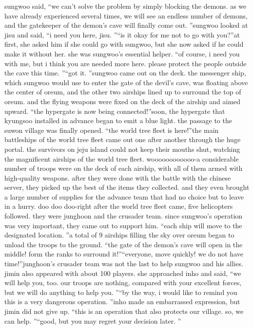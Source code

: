 sungwoo said, “we can’t solve the problem by simply blocking the demons.
 as we have already experienced several times, we will see an endless number of demons, and the gatekeeper of the demon’s cave will finally come out.
”sungwoo looked at jisu and said, “i need you here, jisu.
”“is it okay for me not to go with you?”at first, she asked him if she could go with sungwoo, but she now asked if he could make it without her.
 she was sungwoo’s essential helper.
“of course, i need you with me, but i think you are needed more here.
 please protect the people outside the cave this time.
”“got it.
”sungwoo came out on the deck.
 the messenger ship, which sungwoo would use to enter the gate of the devil’s cave, was floating above the center of oreum, and the other two airships lined up to surround the top of oreum.
and the flying weapons were fixed on the deck of the airship and aimed upward.
“the hypergate is now being connected!”soon, the hypergate that kyungsoo installed in advance began to emit a blue light.
 the passage to the suwon village was finally opened.
“the world tree fleet is here!”the main battleships of the world tree fleet came out one after another through the huge portal.
 the survivors on jeju island could not keep their mouths shut, watching the magnificent airships of the world tree fleet.
woooooooooooo-a considerable number of troops were on the deck of each airship, with all of them armed with high-quality weapons.
after they were done with the battle with the chinese server, they picked up the best of the items they collected.
 and they even brought a large number of supplies for the advance team that had no choice but to leave in a hurry.
doo doo doo-right after the world tree fleet came, five helicopters followed.
 they were junghoon and the crusader team.
 since sungwoo’s operation was very important, they came out to support him.
“each ship will move to the designated location.
”a total of 9 airships filling the sky over oreum began to unload the troops to the ground.
“the gate of the demon’s cave will open in the middle! form the ranks to surround it!”“everyone, move quickly! we do not have time!”junghoon’s crusader team was not the last to help sungwoo and his allies.
jimin also appeared with about 100 players.
she approached inho and said, “we will help you, too.
 our troops are nothing, compared with your excellent forces, but we will do anything to help you.
”“by the way, i would like to remind you this is a very dangerous operation.
”inho made an embarrassed expression, but jimin did not give up.
“this is an operation that also protects our village.
 so, we can help.
”“good, but you may regret your decision later.
”

